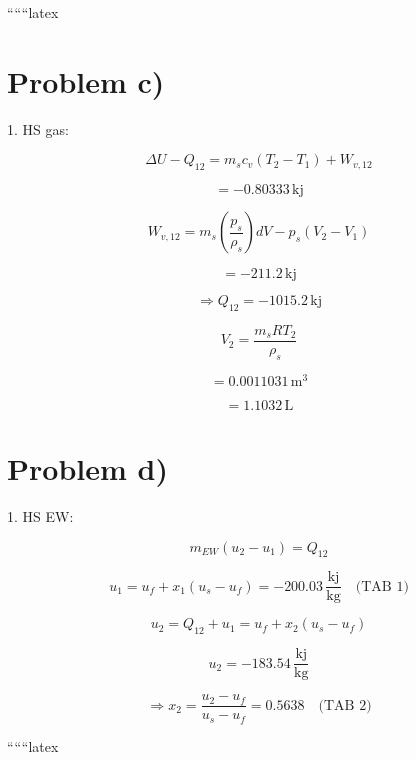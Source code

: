 ``````latex


\section*{Problem c)}

1. HS gas:

\[
\Delta U - Q_{12} = m_s c_v (T_2 - T_1) + W_{v,12}
\]

\[
= -0.80333 \, \text{kj}
\]

\[
W_{v,12} = m_s \left( \frac{p_s}{\rho_s} \right) dV - p_s (V_2 - V_1)
\]

\[
= -211.2 \, \text{kj}
\]

\[
\Rightarrow Q_{12} = -1015.2 \, \text{kj}
\]

\[
V_2 = \frac{m_s R T_2}{\rho_s}
\]

\[
= 0.0011031 \, \text{m}^3
\]

\[
= 1.1032 \, \text{L}
\]

\section*{Problem d)}

1. HS EW:

\[
m_{EW} (u_2 - u_1) = Q_{12}
\]

\[
u_1 = u_f + x_1 (u_s - u_f) = -200.03 \, \frac{\text{kj}}{\text{kg}} \quad \text{(TAB 1)}
\]

\[
u_2 = Q_{12} + u_1 = u_f + x_2 (u_s - u_f)
\]

\[
u_2 = -183.54 \, \frac{\text{kj}}{\text{kg}}
\]

\[
\Rightarrow x_2 = \frac{u_2 - u_f}{u_s - u_f} = 0.5638 \quad \text{(TAB 2)}
\]

``````latex


